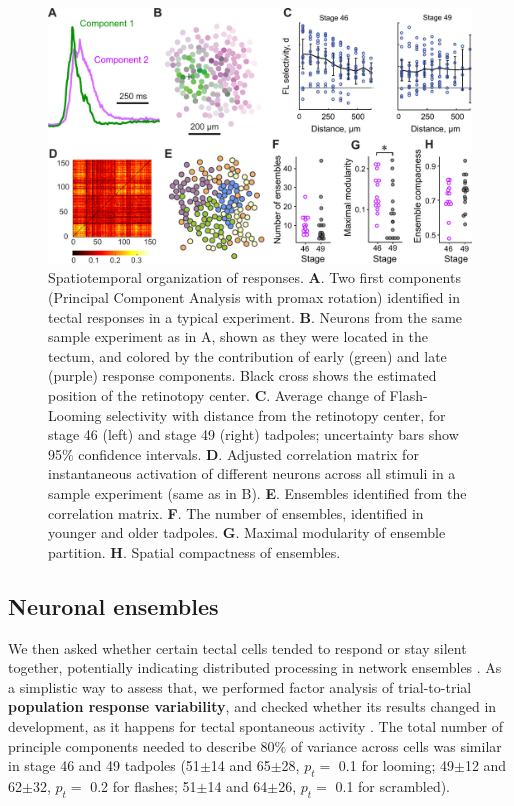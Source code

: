 \documentclass{article}
\begin{document}
\begin{figure}[t!]
\includegraphics[width=\linewidth]{fig3.pdf}
\caption{
Spatiotemporal organization of responses. \textbf{A}. Two first components (Principal Component Analysis with promax rotation) identified in tectal responses in a typical experiment.  \textbf{B}. Neurons from the same sample experiment as in A, shown as they were located in the tectum, and colored by the contribution of early (green) and late (purple) response components. Black cross shows the estimated position of the retinotopy center. \textbf{C}. Average change of Flash-Looming selectivity with distance from the retinotopy center, for stage 46 (left) and stage 49 (right) tadpoles; uncertainty bars show 95\% confidence intervals. \textbf{D}. Adjusted correlation matrix for instantaneous activation of different neurons across all stimuli in a sample experiment (same as in B). \textbf{E}. Ensembles identified from the correlation matrix. \textbf{F}. The number of ensembles, identified in younger and older tadpoles. \textbf{G}. Maximal modularity of ensemble partition. \textbf{H}. Spatial compactness of ensembles.}
\end{figure}

\subsection*{Neuronal ensembles}

We then asked whether certain tectal cells tended to respond or stay silent together, potentially indicating distributed processing in network ensembles \citep{orger2016review}. As a simplistic way to assess that, we performed factor analysis of trial-to-trial \textbf{population response variability}, and checked whether its results changed in development, as it happens for tectal spontaneous activity \citep{xu2011}. The total number of principle components needed to describe 80\% of variance across cells \citep{avitan2017spontaneous} was similar in stage 46 and 49 tadpoles (51$\pm$14 and 65$\pm$28, $p_t=$ 0.1 for looming; 49$\pm$12 and 62$\pm$32, $p_t=$ 0.2 for flashes; 51$\pm$14 and 64$\pm$26, $p_t=$ 0.1 for scrambled).
\end{document}
